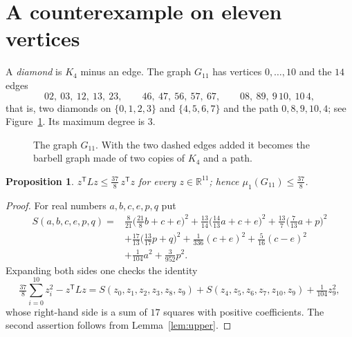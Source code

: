 \documentclass[11pt]{amsart}
\newtheorem{proposition}[theorem]{Proposition}
\theoremstyle{definition}
\theoremstyle{remark}
\newcommand{\R}{\mathbb{R}}
\newcommand{\tr}{^{\mathsf{T}}}
\begin{document}
\section{A counterexample on eleven vertices}\label{sec:G11}

A \emph{diamond} is $K_4$ minus an edge. The graph $G_{11}$ has vertices $0,\dots,10$ and the
$14$ edges
\[
02,\ 03,\ 12,\ 13,\ 23,\qquad 46,\ 47,\ 56,\ 57,\ 67,\qquad 08,\ 89,\ 9\,10,\ 10\,4 ,
\]
that is, two diamonds on $\{0,1,2,3\}$ and $\{4,5,6,7\}$ and the path $0,8,9,10,4$; see
Figure~\ref{fig:G11}. Its maximum degree is $3$.

\begin{figure}[ht]
\centering
{}
\caption{The graph $G_{11}$. With the two dashed edges added it becomes the barbell graph made
of two copies of $K_4$ and a path.}\label{fig:G11}
\end{figure}

\begin{proposition}\label{prop:G11mu}
$z\tr Lz\le\frac{37}{8}\,z\tr z$ for every $z\in\R^{11}$; hence $\mu_1(G_{11})\le\frac{37}{8}$.
\end{proposition}

\begin{proof}
For real numbers $a,b,c,e,p,q$ put
\begin{align*}
S(a,b,c,e,p,q)={}&\tfrac{8}{21}\bigl(\tfrac{21}{8}b+c+e\bigr)^2
+\tfrac{13}{14}\bigl(\tfrac{14}{13}a+c+e\bigr)^2
+\tfrac{13}{7}\bigl(\tfrac{7}{13}a+p\bigr)^2\\
&+\tfrac{17}{13}\bigl(\tfrac{13}{17}p+q\bigr)^2
+\tfrac{1}{336}(c+e)^2+\tfrac{5}{16}(c-e)^2\\
&+\tfrac{1}{104}a^2+\tfrac{3}{952}p^2 .
\end{align*}
Expanding both sides one checks the identity
\[
\tfrac{37}{8}\sum_{i=0}^{10}z_i^2-z\tr Lz
=S(z_0,z_1,z_2,z_3,z_8,z_9)+S(z_4,z_5,z_6,z_7,z_{10},z_9)+\tfrac{1}{104}z_9^2 ,
\]
whose right-hand side is a sum of $17$ squares with positive coefficients. The second assertion
follows from Lemma~\ref{lem:upper}.
\end{proof}
\end{document}
